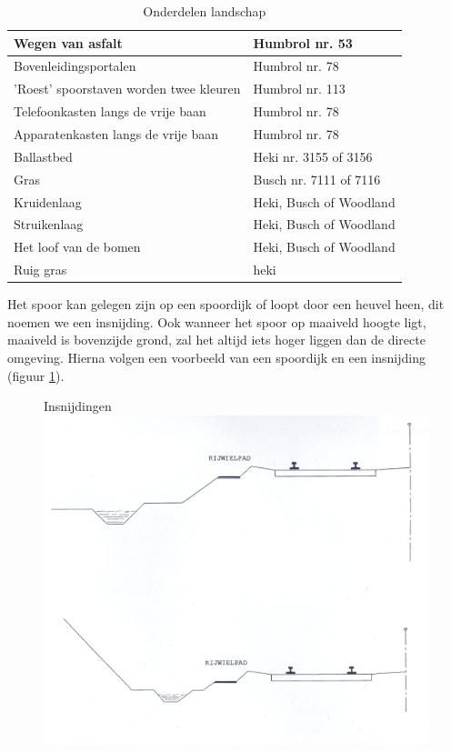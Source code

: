 \documentclass[12pt,a4paper]{report}
\begin{document}
\begin{table}[!ht]
\begin{tabular}{| l | l |}
\hline
\cellcolor[gray]{0.84}Wegen van asfalt&Humbrol nr. 53\\
\hline
\cellcolor[gray]{0.84}Bovenleidingsportalen&Humbrol nr. 78\\
\hline
\cellcolor[gray]{0.84}'Roest' spoorstaven  worden twee kleuren&Humbrol nr. 113\\
\hline
\cellcolor[gray]{0.84}Telefoonkasten langs de vrije baan&Humbrol nr. 78\\
\hline
\cellcolor[gray]{0.84}Apparatenkasten langs de vrije baan&Humbrol nr. 78\\
\hline
\cellcolor[gray]{0.84}Ballastbed&Heki nr. 3155 of 3156\\
\hline
\cellcolor[gray]{0.84}Gras&Busch nr. 7111 of 7116\\
\hline
\cellcolor[gray]{0.84}Kruidenlaag&Heki, Busch of Woodland\\
\hline
\cellcolor[gray]{0.84}Struikenlaag&Heki, Busch of Woodland\\
\hline
\cellcolor[gray]{0.84}Het loof van de bomen&Heki, Busch of Woodland\\
\hline
\cellcolor[gray]{0.84}Ruig gras&heki\\
\hline
\end{tabular}
\caption{Onderdelen landschap}
\end{table}

Het spoor kan gelegen zijn op een spoordijk of loopt door een heuvel heen, dit noemen we een insnijding. Ook wanneer het spoor op maaiveld hoogte ligt, maaiveld is bovenzijde grond, zal het altijd iets hoger liggen dan de directe omgeving. Hierna volgen een voorbeeld van een spoordijk en een insnijding (figuur \ref{figuur13}).

\begin{figure}[!ht]
  \captionbox
  {Insnijdingen\label{figuur13}}
  {\includegraphics[scale=1.0]{images/rcu_figuur13_14}}
\end{figure}
\end{document}
